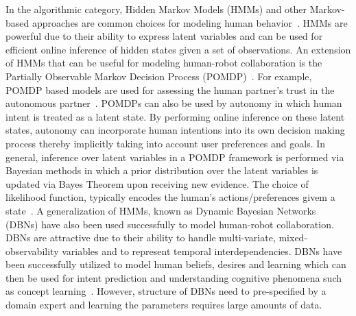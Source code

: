 \documentclass[12pt]{article}
\begin{document}
In the algorithmic category, Hidden Markov Models (HMMs) and other Markov-based approaches are common choices for modeling human behavior~\cite{kelley2008understanding}. HMMs are powerful due to their ability to express latent variables and can be used for efficient online inference of hidden states given a set of observations. An extension of HMMs that can be useful for modeling human-robot collaboration is the Partially Observable Markov Decision Process (POMDP)~\cite{taha2011pomdp}. For example, POMDP based models are used for assessing the human partner's trust in the autonomous partner~\cite{chen2018planning}. 
POMDPs can also be used by autonomy in which human intent is treated as a latent state. By performing online inference on these latent states, autonomy can incorporate human intentions into its own decision making process thereby implicitly taking into account user preferences and goals. In general, inference over latent variables in a POMDP framework is performed via Bayesian methods in which a prior distribution over the latent variables is updated via Bayes Theorem upon receiving new evidence. The choice of likelihood function, typically encodes the human's actions/preferences givem a state~\cite{dragan2012formalizing}. 
A generalization of HMMs, known as Dynamic Bayesian Networks (DBNs) have also been used successfully to model human-robot collaboration. DBNs are attractive due to their ability to handle multi-variate, mixed-observability variables and to represent temporal interdependencies\cite{murphy2002dynamic}. DBNs have been successfully utilized to model human beliefs, desires and learning which can then be used for intent prediction and understanding cognitive phenomena such as concept learning~\cite{tahboub2006intelligent}. However, structure of DBNs need to pre-specified by a domain expert and learning the parameters requires large amounts of data. 
\end{document}
